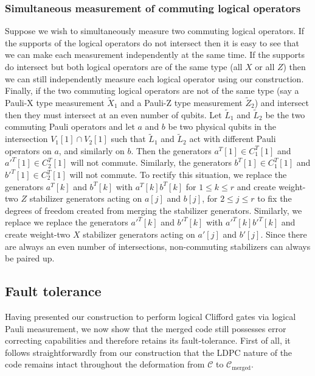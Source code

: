 \documentclass[reprint,
superscriptaddress,
 amsmath,amssymb,
 aps, longbibliography
]{revtex4-1}
\begin{document}
\subsubsection{\label{sec:sim}Simultaneous measurement of commuting logical operators}

Suppose we wish to simultaneously measure two commuting logical operators. If the supports of the logical operators do not intersect then it is easy to see that we can make each measurement independently at the same time. If the supports do intersect but both logical operators are of the same type (all $X$ or all $Z$) then we can still independently measure each logical operator using our construction.  Finally, if the two commuting logical operators are not of the same type (say a Pauli-X type measurement $\tilde{X}_1$ and a Pauli-Z type measurement $\tilde{Z}_2$) and intersect then they must intersect at an even number of qubits. Let $\tilde{L}_1$ and $\tilde{L}_2$ be the two commuting Pauli operators and let $a$ and $b$ be two physical qubits in the intersection $V_1[1] \cap V_2[1]$ such that $\tilde{L}_1$ and $\tilde{L}_2$ act with different Pauli operators on $a$, and similarly on $b$. Then the generators $a^T[1] \in C_1^T[1]$ and $a'^T[1] \in C_2^T[1]$ will not commute. Similarly, the generators $b^T[1] \in C_1^T[1]$ and $b'^T[1] \in C_2^T[1]$ will not commute. To rectify this situation, we replace the generators $a^T[k]$ and $b^T[k]$ with $a^T[k]b^T[k]$ for $1 \leq k \leq r$ and create weight-two $Z$ stabilizer generators acting on $a[j]$ and $b[j]$, for $2 \leq j \leq r$ to fix the degrees of freedom created from merging the stabilizer generators. Similarly, we replace we replace the generators $a'^T[k]$ and $b'^T[k]$ with $a'^T[k]b'^T[k]$ and create weight-two $X$ stabilizer generators acting on $a'[j]$ and $b'[j]$. Since there are always an even number of intersections, non-commuting stabilizers can always be paired up.

\subsection{\label{sec:fault_tol}Fault tolerance}

Having presented our construction to perform logical Clifford gates via logical Pauli measurement, we now show that the merged code still possesses error correcting capabilities and therefore retains its fault-tolerance. First of all, it follows straightforwardly from our construction that the LDPC nature of the code remains intact throughout the deformation from $\mathcal{C}$ to $\mathcal{C}_{\text{merged}}$.
\end{document}
